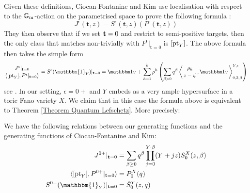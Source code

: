 Given these definitions, Ciocan-Fontanine and Kim use localisation with respect to the $\mathbb{G}_{\text{m}}$-action on the parametrised space to prove the following formula \cite[Theorem 5.4.1]{CF-K-wallcrossing}:
\[
 J^\epsilon(\mathbf{t},z)=S^\epsilon(\mathbf{t},z)(P^\epsilon(\mathbf{t},z))
\]
They then observe that if we set ${\bf t}=0$ and restrict to semi-positive targets, then the only class that matches non-trivially with ${P^\epsilon}|_{\mathbf{t}=0}$ is $[\operatorname{pt}_Y]$. The above formula then takes the simple form
\begin{equation} \label{Ciocan-Fontanine Theorem t zero}
 \frac{J^\epsilon |_{{\bf t}=0}}{\langle [\pt_Y],  P^\epsilon|_{{\bf t}=0}\rangle}=S^\epsilon(\mathbbm{1}_Y)|_{\mathbf{t}=0} = \mathbbm 1_Y+\sum_{h=1}^k \rho^h \left(\sum_{\beta> 0}q^\beta\left\langle\frac{\rho_h}{z-\psi},\mathbbm 1_Y\right\rangle_{0,2,\beta}^{Y,\epsilon} \right)\end{equation}
see \cite[Corollary 5.5.1]{CF-K-wallcrossing}. In our setting, $\epsilon=0+$ and $Y$ embeds as a very ample hypersurface in a toric Fano variety $X$. We claim that in this case the formula above is equivalent to Theorem \ref{Theorem Quantum Lefschetz}. More precisely:
\begin{lem} We have the following relations between our generating functions and the generating functions of Ciocan-Fontanine and Kim:
\begin{align}
\label{J epsilon equation} J^{0+}|_{\mathbf{t}=0} & = \sum_{\beta \geq 0} q^\beta \prod_{j=0}^{Y \cdot \beta} (Y + jz) S_0^X(z,\beta) \\
\label{P epsilon equation} \langle [\pt_Y], P^{0+}|_{\mathbf{t}=0} \rangle & = P_0^X(q) \\
\label{S epsilon equation} S^{0+}(\mathbbm{1}_Y)|_{\mathbf{t}=0} & = \tilde{S}^Y_0(z,q)
\end{align}
\end{lem}
